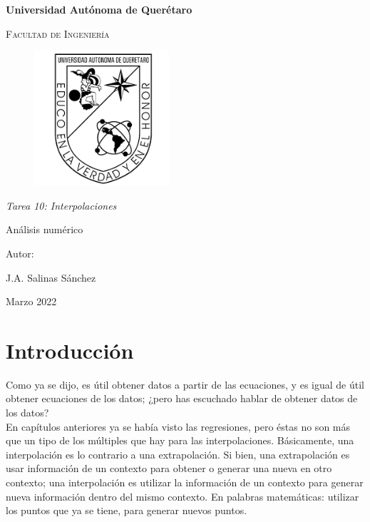 \documentclass[12pt,oneside,FLEQN]{report}
\begin{document}
{
\selectfont
\begin{titlepage}
        \topmargin=0cm
        \centering

        {\bfseries\LARGE Universidad Autónoma de Querétaro \par}
        \vspace{1cm}
        {\scshape\Large  Facultad de Ingenier\'ia  \par}
        \vspace{2cm}
        \centering
        \begin{figure}[!h]
        \centering
                \includegraphics[height=5cm]{Logouaq.png}
        \end{figure}
        \vspace{3cm}
        {\itshape\large Tarea 10: Interpolaciones \par}
        \vspace{3cm}
        {\Huge Análisis numérico \par}
        \vspace{2cm}
        {\Large Autor: \par}
        {\large J.A. Salinas Sánchez \par}
        {\large Marzo 2022 \par}
\end{titlepage}
\tableofcontents
\chapter{Introducción}
Como ya se dijo, es útil obtener datos a partir de las ecuaciones, y es igual de útil obtener ecuaciones de los datos; ¿pero has escuchado hablar de obtener datos de los datos?\\

En capítulos anteriores ya se había visto las regresiones, pero éstas no son más que un tipo de los múltiples que hay para las interpolaciones. Básicamente, una interpolación es lo contrario a una extrapolación. Si bien, una extrapolación es usar información de un contexto para obtener o generar una nueva en otro contexto; una interpolación es utilizar la información de un contexto para generar nueva información dentro del mismo contexto. En palabras matemáticas: utilizar los puntos que ya se tiene, para generar nuevos puntos.\\

}
\end{document}

